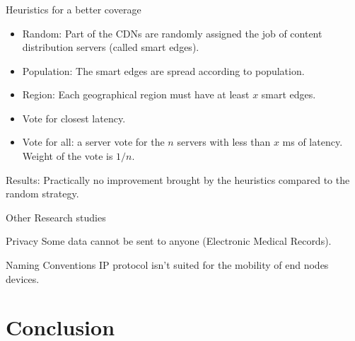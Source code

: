 \documentclass[utf8,xcolor=table, page number]{earlywinter}
\begin{document}
\begin{frame}
  \frametitle{\secname}
  \framesubtitle{\subsecname}

  \begin{exampleblock}{Heuristics for a better coverage}
    \begin{itemize}
      \item Random: Part of the CDNs are randomly assigned the job of content distribution servers (called smart edges).
      \item Population: The smart edges are spread according to population.
      \item Region: Each geographical region must have at least $x$ smart edges.
      \item Vote for closest latency.
      \item Vote for all: a server vote for the $n$ servers with less than $x$ ms of latency. Weight of the vote is $1/n$.
    \end{itemize}
    Results: Practically no improvement brought by the heuristics compared to the random strategy.
  \end{exampleblock}
  
\end{frame}

\begin{frame}{Other Research studies} %
  
  \begin{alertblock}{Privacy}
    Some data cannot be sent to anyone (Electronic Medical Records).
  \end{alertblock}

  \begin{alertblock}{Naming Conventions}
    IP protocol isn't suited for the mobility of end nodes devices.
  \end{alertblock}

  
\end{frame}



\section*{Conclusion}
\end{document}
